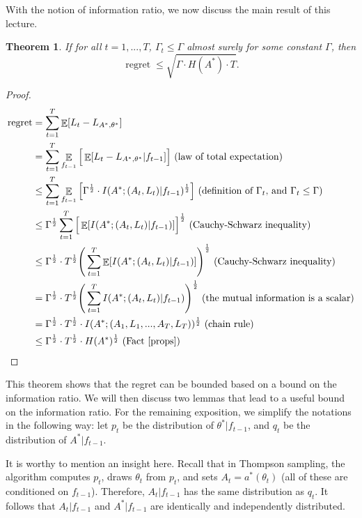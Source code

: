 \documentclass[11pt]{article}
\newtheorem{theorem}{Theorem}[section]
\DeclareMathOperator*{\E}{\mathbb{E}}
\DeclareMathOperator{\reg}{regret}
\begin{document}
With the notion of information ratio, we now discuss the main result of this lecture.
\begin{theorem}\label{main}
If for all $t = 1, ..., T$, $\Gamma_t \le \Gamma$ almost surely for some constant $\Gamma$, then
\begin{equation*}
    \reg \le \sqrt{\Gamma \cdot H(A^*) \cdot T}.
\end{equation*}
\end{theorem}
\begin{proof}
\begin{align*}
    \reg & = \sum_{t=1}^T \E[L_t - L_{A^*, \theta^*}] \\
    & = \sum_{t=1}^T \E_{f_{t-1}}\Big[\E[L_t - L_{A^*, \theta^*} | f_{t-1}] \Big] \text{ (law of total expectation)} \\
    & \le \sum_{t=1}^T \E_{f_{t-1}} \Big[\Gamma^{\frac{1}{2}} \cdot I(A^*;(A_t, L_t) | f_{t-1})^{\frac{1}{2}}\Big] \text{ (definition of $\Gamma_t$, and $\Gamma_t \le \Gamma$)} \\
    & \le \Gamma^{\frac{1}{2}} \sum_{t=1}^T \Big[\E[I(A^*;(A_t, L_t) | f_{t-1})]\Big]^{\frac{1}{2}} \text{ (Cauchy-Schwarz inequality)} \\
    & \le \Gamma^{\frac{1}{2}} \cdot T^{\frac{1}{2}} \Bigg(\sum_{t=1}^T \E[I(A^*;(A_t, L_t) | f_{t-1})]\Bigg)^{\frac{1}{2}} \text{ (Cauchy-Schwarz inequality)} \\
    & = \Gamma^{\frac{1}{2}} \cdot T^{\frac{1}{2}}\Bigg(\sum_{t=1}^T I(A^*;(A_t, L_t)|f_{t-1})\Bigg)^{\frac{1}{2}} \text{ (the mutual information is a scalar)} \\
    & = \Gamma^{\frac{1}{2}} \cdot T^{\frac{1}{2}} \cdot I(A^*;(A_1, L_1, ..., A_T, L_T))^{\frac{1}{2}} \text{ (chain rule)} \\
    & \le \Gamma^{\frac{1}{2}} \cdot T^{\frac{1}{2}} \cdot H(A^*)^{\frac{1}{2}} \text{ (Fact \ref{props})}
\end{align*}
\end{proof}

This theorem shows that the regret can be bounded based on a bound on the information ratio. We will then discuss two lemmas that lead to a useful bound on the information ratio. For the remaining exposition, we simplify the notations in the following way: let $p_t$ be the distribution of $\theta^* | f_{t-1}$, and $q_t$ be the distribution of $A^* | f_{t-1}$.

It is worthy to mention an insight here. Recall that in Thompson sampling, the algorithm computes $p_t$, draws $\theta_t$ from $p_t$, and sets $A_t = a^*(\theta_t)$ (all of these are conditioned on $f_{t-1}$). Therefore, $A_t|f_{t-1}$ has the same distribution as $q_t$. It follows that $A_t|f_{t-1}$ and $A^*|f_{t-1}$ are identically and independently distributed.
\end{document}
